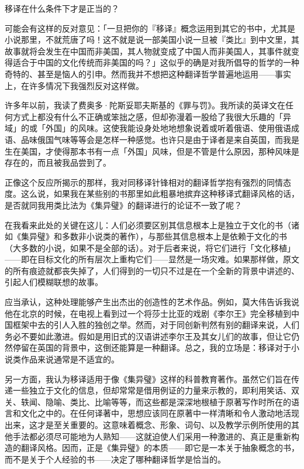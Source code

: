 \documentclass[
  12pt,
  twoside,
  openright,
  oldfontcommands,
]{memoir}
\begin{document}
{移译在什}么条件下才是正当的？

可能会有这样的反对意见：「一旦把你的『移译』概念运用到其它的书中，尤其是小说那里，不就荒唐了吗！这不就是说一部美国小说一旦被『类比』到中文里，其故事就将会发生在中国而非美国，其人物就变成了中国人而非美国人，其事件就变得适合于中国的文化传统而非美国的吗？」这似乎的确是对我所倡导的哲学的一种奇特的、甚至是恼人的引申。然而我并不想把这种翻译哲学普遍地运用------事实上，在许多情况下我强烈反对这样做。

许多年以前，我读了费奥多·陀斯妥耶夫斯基的《罪与罚》。我所读的英译文在任何方式上都没有什么不正确或笨拙之感，但却弥漫着一股给了我很大乐趣的「异域」的或「外国」的风味。这使我能设身处地地想象说着或听着俄语、使用俄语成语、品味俄国气味等等会是怎样一种感觉。也许只是由于译者是来自英国，而我是生在美国，才使得那本书有一点「外国」风味，但是不管是什么原因，那种风味是存在的，而且被我品尝到了。

正像这个反应所揭示的那样，我对同移译针锋相对的翻译哲学抱有强烈的同情态度。这么说，如果我在某些别的书那里如此粗暴地摈弃这种移译式翻译风格的话，是否就同我用类比法为《集异璧》的翻译进行的论证不一致了呢？

在我看来此处的关键在这儿：人们必须要区别其信息根本上是独立于文化的书（诸如《集异璧》和多数非小说类的著作），与那些其信息根本上是依赖于文化的书（大多数的小说，如果不是全部的话）。对于后者来说，将它们进行「文化移植」------即在目标文化的所有层次上重构它们------显然是一场灾难。如果那样做，原文的所有痕迹就都丧失掉了，人们得到的一切只不过是在一个全新的背景中讲述的、引起人们模糊联想的故事。

应当承认，这种处理能够产生出杰出的创造性的艺术作品。例如，莫大伟告诉我说他在北京的时候，在电视上看到过一个将莎士比亚的戏剧《李尔王》完全移植到中国框架中去的引人入胜的独创之举。然而，对于同创新判然有别的翻译来说，人们务必不要如此激进。假如是用旧式的汉语讲述李尔王及其女儿们的故事，但让它仍然停留在英国的背景中，这倒还能算是一种翻译。总之，我的立场是：移译对于小说类作品来说通常是不适宜的。

另一方面，我认为移译适用于像《集异璧》这样的科普教育著作。虽然它们旨在传递一些独立于文化的信息，但却常常是借用例证的力量来示教的，即利用笑话、双关、轶闻、隐喻、类比、比喻等等，而这些都是深深地根植于原著写作时所在的语言和文化之中的。在任何译著中，思想应该同在原著中一样清晰和令人激动地活现出来，这才是至关重要的。这意味着概念、形象、词句、以及教学示例所使用的其他手法都必须尽可能地为人熟知------这就迫使人们采用一种激进的、真正是重新构造的翻译风格。因而，正是《集异璧》的本质------即它是一本关于抽象概念的书，而不是关于个人经验的书------决定了哪种翻译哲学是恰当的。
\end{document}
